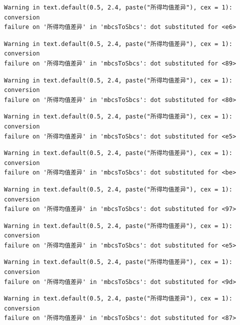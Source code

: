 \documentclass[
  letterpaper,
  DIV=11,
  numbers=noendperiod]{scrreprt}
\begin{document}
\begin{verbatim}
Warning in text.default(0.5, 2.4, paste("所得均值差异"), cex = 1): conversion
failure on '所得均值差异' in 'mbcsToSbcs': dot substituted for <e6>
\end{verbatim}

\begin{verbatim}
Warning in text.default(0.5, 2.4, paste("所得均值差异"), cex = 1): conversion
failure on '所得均值差异' in 'mbcsToSbcs': dot substituted for <89>
\end{verbatim}

\begin{verbatim}
Warning in text.default(0.5, 2.4, paste("所得均值差异"), cex = 1): conversion
failure on '所得均值差异' in 'mbcsToSbcs': dot substituted for <80>
\end{verbatim}

\begin{verbatim}
Warning in text.default(0.5, 2.4, paste("所得均值差异"), cex = 1): conversion
failure on '所得均值差异' in 'mbcsToSbcs': dot substituted for <e5>
\end{verbatim}

\begin{verbatim}
Warning in text.default(0.5, 2.4, paste("所得均值差异"), cex = 1): conversion
failure on '所得均值差异' in 'mbcsToSbcs': dot substituted for <be>
\end{verbatim}

\begin{verbatim}
Warning in text.default(0.5, 2.4, paste("所得均值差异"), cex = 1): conversion
failure on '所得均值差异' in 'mbcsToSbcs': dot substituted for <97>
\end{verbatim}

\begin{verbatim}
Warning in text.default(0.5, 2.4, paste("所得均值差异"), cex = 1): conversion
failure on '所得均值差异' in 'mbcsToSbcs': dot substituted for <e5>
\end{verbatim}

\begin{verbatim}
Warning in text.default(0.5, 2.4, paste("所得均值差异"), cex = 1): conversion
failure on '所得均值差异' in 'mbcsToSbcs': dot substituted for <9d>
\end{verbatim}

\begin{verbatim}
Warning in text.default(0.5, 2.4, paste("所得均值差异"), cex = 1): conversion
failure on '所得均值差异' in 'mbcsToSbcs': dot substituted for <87>
\end{verbatim}
\end{document}
